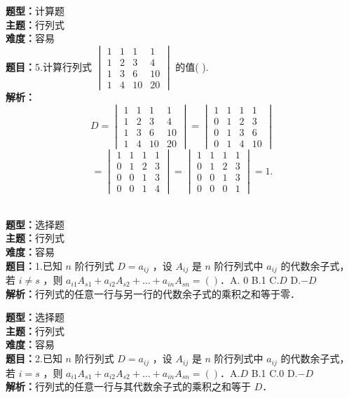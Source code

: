 \documentclass{ctexart}
\newenvironment{question}[5]{%
	\noindent\textbf{题型：}#1\\
	\textbf{主题：}#2\\
	\textbf{难度：}#3\\
	\textbf{题目：}#4\\
	\textbf{解析：}#5\\
	\vspace{1em}
}{}
\begin{document}
	\begin{question}
		{计算题}
		{行列式}
		{容易}
		{5.计算行列式 $\begin{vmatrix}1 & 1 & 1 & 1 \\ 1 & 2 & 3 & 4 \\ 1 & 3 & 6 & 10 \\ 1 & 4 & 10 & 20\end{vmatrix}$ 的值(  ).}
		{
			\[
			D = \begin{vmatrix}
				1 & 1 & 1 & 1 \\
				1 & 2 & 3 & 4 \\
				1 & 3 & 6 & 10 \\
				1 & 4 & 10 & 20
			\end{vmatrix} =
			\begin{vmatrix}
				1 & 1 & 1 & 1 \\
				0 & 1 & 2 & 3 \\
				0 & 1 & 3 & 6 \\
				0 & 1 & 4 & 10
			\end{vmatrix}
			\]
			\[
			=
			\begin{vmatrix}
				1 & 1 & 1 & 1 \\
				0 & 1 & 2 & 3 \\
				0 & 0 & 1 & 3 \\
				0 & 0 & 1 & 4
			\end{vmatrix} =
			\begin{vmatrix}
				1 & 1 & 1 & 1 \\
				0 & 1 & 2 & 3 \\
				0 & 0 & 1 & 3 \\
				0 & 0 & 0 & 1
			\end{vmatrix} = 1.
			\]}
	\end{question}
	
	\begin{question}
		{选择题}
		{行列式}
		{容易}
		{1.已知 $n$ 阶行列式 $D=a_{i j}$ ，设 $A_{i j}$ 是 $n$ 阶行列式中 $a_{i j}$ 的代数余子式，若 $i \neq s$ ，则 $a_{i 1} A_{s 1}+a_{i 2} A_{s 2}+\ldots+a_{i n} A_{s n}=(  )$．A. 0 B.1 C.$D$ D.$-D$}
		{行列式的任意一行与另一行的代数余子式的乘积之和等于零．}
	\end{question}
	
	
	\begin{question}
		{选择题}
		{行列式}
		{容易}
		{2.已知 $n$ 阶行列式 $D=a_{i j}$ ，设 $A_{i j}$ 是 $n$ 阶行列式中 $a_{i j}$ 的代数余子式，若 $i=s$ ，则 $a_{i 1} A_{s 1}+a_{i 2} A_{s 2}+\ldots+a_{i n} A_{s n}=(  )$．A.$D$ B.1 C.0 D.$-D$}
		{行列式的任意一行与其代数余子式的乘积之和等于 $D$．}
	\end{question}
	
\end{document}
